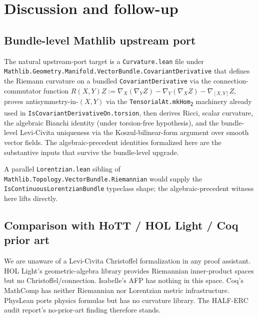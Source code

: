 \documentclass[twocolumn]{revtex4-2}
\newcommand{\Riem}{R}
\begin{document}
\section{Discussion and follow-up}\label{sec:disc}

\subsection{Bundle-level Mathlib upstream port}
The natural upstream-port target is a \texttt{Curvature.lean} file
under \texttt{Mathlib.Geometry.Manifold.VectorBundle.CovariantDerivative}
that defines the Riemann curvature on a bundled \texttt{CovariantDerivative}
via the connection-commutator function
$\Riem(X,Y)Z := \nabla_{X}(\nabla_{Y}Z) - \nabla_{Y}(\nabla_{X}Z)
- \nabla_{[X,Y]}Z$, proves antisymmetry-in-$(X,Y)$ via the
\texttt{TensorialAt.mkHom\textsubscript{2}} machinery already used in
\texttt{IsCovariantDerivativeOn.torsion}, then derives Ricci, scalar
curvature, the algebraic Bianchi identity (under torsion-free
hypothesis), and the bundle-level Levi-Civita uniqueness via the
Koszul-bilinear-form argument over smooth vector fields. The
algebraic-precedent identities formalized here are the substantive
inputs that survive the bundle-level upgrade.

A parallel \texttt{Lorentzian.lean} sibling of
\texttt{Mathlib.Topology.VectorBundle.Riemannian} would supply the
\texttt{IsContinuousLorentzianBundle} typeclass shape; the
algebraic-precedent witness here lifts directly.

\subsection{Comparison with HoTT / HOL Light / Coq prior art}
We are unaware of a Levi-Civita Christoffel formalization in any
proof assistant. HOL Light's geometric-algebra library provides
Riemannian inner-product spaces but no Christoffel/connection.
Isabelle's AFP has nothing in this space. Coq's MathComp has
neither Riemannian nor Lorentzian metric infrastructure. PhysLean
ports physics formulas but has no curvature library. The HALF-ERC
audit report's no-prior-art finding therefore stands.
\end{document}
